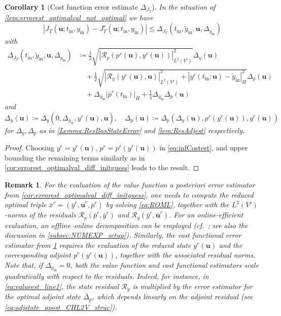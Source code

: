 \documentclass{m2an}
\newcommand{\bu}{\mathbf{u}}
\newcommand{\tint}{t_{\mathrm{in}}}
\newcommand{\yint}{y_{\mathrm{in}}}
\newcommand{\tildeyint}{\tilde y_{\mathrm{in}}}
\newcommand{\calR}{\mathcal{R}}
\newcommand{\Res}{\calR}%
\newcommand{\norm}[2]{\left|#1\right|_{#2}}
\newtheorem{remark}[thrm]{Remark}
\newtheorem{corollary}[thrm]{Corollary}
\begin{document}
\begin{corollary}[Cost function error estimate $\Delta_{J_T}$]
    \label{cor:costbound}
    In the situation of \cref{lem:errorest_optimalval_not_optimal} we have
    \begin{equation}
        \label{eq:errorest_value_not_optimal}
        |J_T(\bu ;\tint,\yint)- J^r_T(\bu;\tint,\yint)|\leq \Delta_{J_T}(\tint,\tildeyint,\bu,\Delta_{\yint})
    \end{equation}
    with 
    \begin{align*}
       \Delta_{J_T}(\tint, \tildeyint, \bu, \Delta_{\yint} )&\coloneqq \tfrac{1}{2}\sqrt{\norm{\Res_p(p^r(\bu), y^r(\bu))}{L^2(V')}^2}\Delta_{y}(\bu)\\
        &\quad+\tfrac{1}{2}\sqrt{\norm{\Res_y(y^r(\bu),\bu)}{L^2(V')}^2+\norm{y^r(\tint;\bu)-\tildeyint}{H}^2}\Delta_{p}(\bu)\\
        &\quad+\Delta_{\yint}{\norm{\bar { p}^r(\tint) }{H}}+ \tfrac{1}{4}\Delta_{\yint}\Delta_{p}(\bu)
    \end{align*}
    and 
    \begin{equation*}
        \Delta_y(\bu) \coloneqq \Delta_{y}(0, \Delta_{\yint}, y^r(\bu), \bu),\quad  \Delta_p(\bu)\coloneqq \Delta_{p}(\Delta_{y}(\bu), p^r(y^r(\bu)), y^r(\bu))
    \end{equation*}
    for $\Delta_{y},\Delta_p$ as in \cref{Lemma:ResBasStateError} and \cref{lem:ResAdjest} respectively.
\end{corollary}

\begin{proof}
   Choosing $y^r= y^r(\bu)$, $p^r= p^r(y^r(\bu))$ in \eqref{eq:infCostest}, and upper bounding the remaining terms similarly as in \cref{cor:errorest_optimalval_diff_initguess} leads to the result.
\end{proof}
%
\begin{remark}

{ For the evaluation of the value function a posteriori error estimator from
\cref{cor:errorest_optimalval_diff_initguess}, one needs to compute the reduced optimal
triple \(\bar x^r = (\bar y^r, \bar{\bu}^r, \bar p^r)\) by solving \eqref{eq:ROML}, together
with the \(L^2(V')\)-norms of the residuals \(\calR_p(\bar p^r, \bar y^r)\) and
\(\calR_y(\bar y^r, \bar{\bu}^r)\).
For an online-efficient evaluation, an offline--online decomposition can be employed
(cf.~\cite{hesthaven2016certified}; see also the discussion in
\cref{subsec:NUMEXP_setup}). Similarly, the cost functional error estimator from \cref{cor:costbound} requires the
evaluation of the reduced state \(y^r(\bu)\) and the corresponding adjoint
\(p^r(y^r(\bu))\), together with the associated residual norms.}
{ Note that, if \(\Delta_{\yint}=0\), both the value function and cost functional
estimators scale quadratically with respect to the residuals. Indeed, for instance, in
\eqref{eq:valueest_line1}, the state residual \(\calR_y\) is multiplied by the error
estimator for the optimal adjoint state \(\bar{\Delta}_p\), which depends linearly on the
adjoint residual (see \eqref{eq:adjstate_apost_CHL2V_struc}).}
\end{remark}
%
\end{document}
